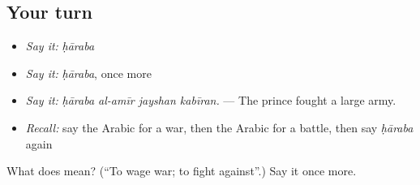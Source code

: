 \subsection*{Your turn}
\begin{itemize}
\raggedright
  \item \emph{Say it:} \emph{ḥāraba}
  \item \emph{Say it:} \emph{ḥāraba}, once more
  \item \emph{Say it:} \emph{ḥāraba al-amīr jayshan kabīran.} — The prince fought a large army.
  \item \emph{Recall:} say the Arabic for a war, then the Arabic for a battle, then say \emph{ḥāraba} again
\end{itemize}

\begin{tcolorbox}[breakable,colback=teal!4,colframe=teal!35!black,title={Before you move on}]
What does  mean? (\textquotedblleft{}To wage war; to fight against\textquotedblright{}.) Say it once more.
\end{tcolorbox}

